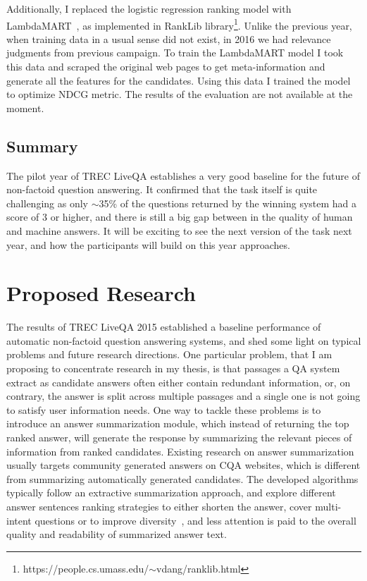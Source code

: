 Additionally, I replaced the logistic regression ranking model with LambdaMART~\cite{burges2010ranknet}, as implemented in RankLib library\footnote{https://people.cs.umass.edu/$\sim$vdang/ranklib.html}.
Unlike the previous year, when training data in a usual sense did not exist, in 2016 we had relevance judgments from previous campaign.
To train the LambdaMART model I took this data and scraped the original web pages to get meta-information and generate all the features for the candidates.
Using this data I trained the model to optimize NDCG metric.
The results of the evaluation are not available at the moment.

\subsection{Summary}
\label{section:non-factoid:liveqa:summary}

The pilot year of TREC LiveQA establishes a very good baseline for the future of non-factoid question answering.
It confirmed that the task itself is quite challenging as only $\sim$35\% of the questions returned by the winning system had a score of 3 or higher, and there is still a big gap between in the quality of human and machine answers.
It will be exciting to see the next version of the task next year, and how the participants will build on this year approaches.



\section{Proposed Research}
\label{section:non-factoid:proposal}

The results of TREC LiveQA 2015 established a baseline performance of automatic non-factoid question answering systems, and shed some light on typical problems and future research directions.
One particular problem, that I am proposing to concentrate research in my thesis, is that passages a QA system extract as candidate answers often either contain redundant information, or, on contrary, the answer is split across multiple passages and a single one is not going to satisfy user information needs.
One way to tackle these problems is to introduce an answer summarization module, which instead of returning the top ranked answer, will generate the response by summarizing the relevant pieces of information from ranked candidates.
Existing research on answer summarization usually targets community generated answers on CQA websites, which is different from summarizing automatically generated candidates.
The developed algorithms typically follow an extractive summarization approach, and explore different answer sentences ranking strategies to either shorten the answer, cover multi-intent questions or to improve diversity~\cite{chan2012community,zhaochun_sparsecoding_2016}, and less attention is paid to the overall quality and readability of summarized answer text.

